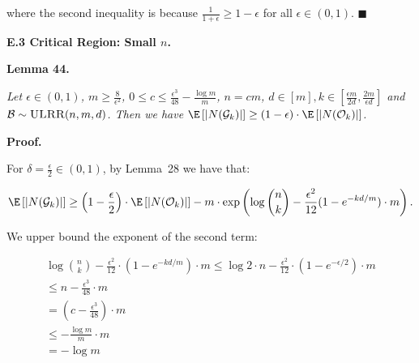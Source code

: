 where the second inequality is because $\frac{1}{1+\epsilon}\geq 1-\epsilon$ for all $\epsilon\in(0,1)$.
\ensuremath{\blacksquare}\par






\par\medskip\noindent\textbf{E.3 Critical Region: Small $n$.}\par





\par\medskip\noindent\textbf{\textbf{Lemma 44}\textbf{.}}\par



\emph{Let $\epsilon\in(0,1)$, $m\geq\frac{8}{\epsilon^{2}}$, $0\leq c\leq\frac{\epsilon^{3}}{48}-\frac{\log{m}}{m}$, $n=cm$, $d\in[m],k\in[\frac{\epsilon m}{2d},\frac{2m}{\epsilon d}]$ and $\mathcal{B}\sim\textsc{ULRR}(n,m,d)$.
Then we have $\E\left[|N(\mathcal{G}_{k})|\right]\geq\left(1-\epsilon\right)\cdot\E\left[|N(\mathcal{O}_{k})|\right]$.}\par






\par\medskip\noindent\textbf{Proof.}\par



For $\delta=\frac{\epsilon}{2}\in(0,1)$, by Lemma 28 we have that:\par


\[\begin{gathered}
\displaystyle\E\left[|N(\mathcal{G}_{k})|\right]\geq\left(1-\frac{\epsilon}{2}\right)\cdot\E\left[|N(\mathcal{O}_{k})|\right]-m\cdot\exp\left(\log{\binom{n}{k}}-\frac{\epsilon^{2}}{12}(1-e^{-kd/m})\cdot m\right).
\end{gathered}\]


We upper bound the exponent of the second term:\par


\[\begin{gathered}
\displaystyle\log{\binom{n}{k}}-\frac{\epsilon^{2}}{12}\cdot(1-e^{-kd/m})\cdot m \displaystyle\leq\log{2}\cdot n-\frac{\epsilon^{2}}{12}\cdot(1-e^{-\epsilon/2})\cdot m \\
\displaystyle\leq n-\frac{\epsilon^{3}}{48}\cdot m \\
\displaystyle=\left(c-\frac{\epsilon^{3}}{48}\right)\cdot m \\
\displaystyle\leq-\frac{\log{m}}{m}\cdot m \\
\displaystyle=-\log{m}
\end{gathered}\]



